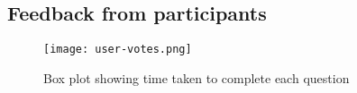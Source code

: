 \subsection*{Feedback from participants}
\begin{figure}[H]
    \centering
    \texttt{[image: user-votes.png]}
    \caption{Box plot showing time taken to complete each question}
\end{figure}
\begin{flushleft}
    
\end{flushleft}


